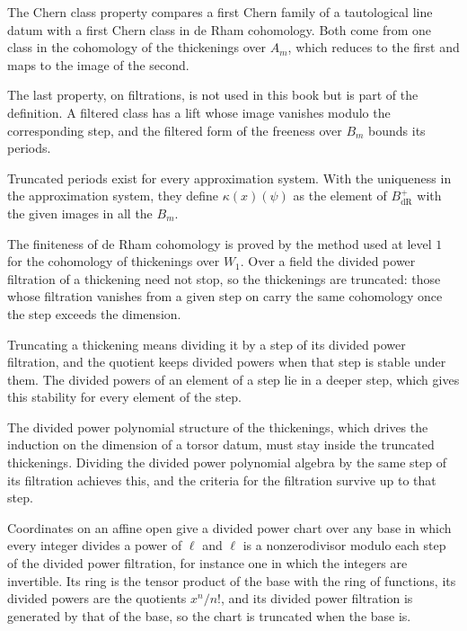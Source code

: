 The Chern class property compares a first Chern family of a tautological line datum with a first Chern class in de Rham
cohomology. Both come from one class in the cohomology of the thickenings over $A_m$, which reduces to the first and
maps to the image of the second.

The last property, on filtrations, is not used in this book but is part of the definition. A filtered class has a lift
whose image vanishes modulo the corresponding step, and the filtered form of the freeness over $B_m$ bounds its periods.

Truncated periods exist for every approximation system. With the uniqueness in the approximation system, they define
$\kappa(x)(\psi)$ as the element of $B_{\mathrm{dR}}^+$ with the given images in all the $B_m$.

The finiteness of de Rham cohomology is proved by the method used at level $1$ for the cohomology of thickenings over
$W_1$. Over a field the divided power filtration of a thickening need not stop, so the thickenings are truncated: those
whose filtration vanishes from a given step on carry the same cohomology once the step exceeds the dimension.

Truncating a thickening means dividing it by a step of its divided power filtration, and the quotient keeps divided
powers when that step is stable under them. The divided powers of an element of a step lie in a deeper step, which
gives this stability for every element of the step.

The divided power polynomial structure of the thickenings, which drives the induction on the dimension of a torsor
datum, must stay inside the truncated thickenings. Dividing the divided power polynomial algebra by the same step of its
filtration achieves this, and the criteria for the filtration survive up to that step.

Coordinates on an affine open give a divided power chart over any base in which every integer divides a power of $\ell$
and $\ell$ is a nonzerodivisor modulo each step of the divided power filtration, for instance one in which the integers
are invertible. Its ring is the tensor product of the base with the ring of functions, its divided powers are the
quotients $x^n/n!$, and its divided power filtration is generated by that of the base, so the chart is truncated when
the base is.

